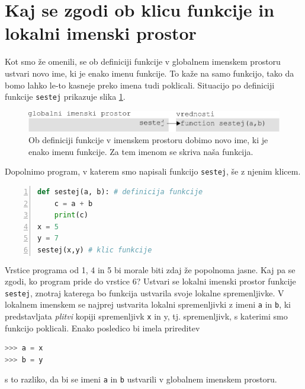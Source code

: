\section{Kaj se zgodi ob klicu funkcije in lokalni imenski prostor}
Kot smo že omenili, se ob definiciji funkcije v globalnem imenskem prostoru ustvari novo ime, ki je enako imenu funkcije. To kaže na samo funkcijo, tako da bomo lahko le-to kasneje preko imena tudi poklicali. Situacijo po definiciji funkcije \texttt{sestej} prikazuje slika \ref{img:imenski_prostor_2}. \begin{figure}
    \includegraphics[width=\linewidth]{img/imenski_prostor_2.pdf}
    \caption{Ob definiciji funkcije v imenskem prostoru dobimo novo ime, ki je enako imenu funkcije. Za tem imenom se skriva naša funkcija.}
    \label{img:imenski_prostor_2}
\end{figure}

Dopolnimo program, v katerem smo napisali funkcijo \texttt{sestej}, še z njenim klicem.
\begin{lstlisting}[language=Python,numbers=left]
def sestej(a, b): # definicija funkcije
    c = a + b
    print(c)
x = 5
y = 7
sestej(x,y) # klic funkcije
\end{lstlisting}
Vrstice programa od 1, 4 in 5 bi morale biti zdaj že popolnoma jasne. Kaj pa se zgodi, ko program pride do vrstice 6? Ustvari se lokalni imenski prostor funkcije \texttt{sestej}, znotraj katerega bo funkcija ustvarila svoje lokalne spremenljivke. V lokalnem imenskem se najprej ustvarita lokalni spremenljivki z imeni \texttt{a} in \texttt{b}, ki predstavljata \emph{plitvi} kopiji spremenljivk \texttt{x} in {y}, tj. spremenljivk, s katerimi smo funkcijo poklicali. Enako posledico bi imela prireditev
\begin{lstlisting}[language=Python]
>>> a = x
>>> b = y
\end{lstlisting}
s to razliko, da bi se imeni \texttt{a} in \texttt{b} ustvarili v globalnem imenskem prostoru.

